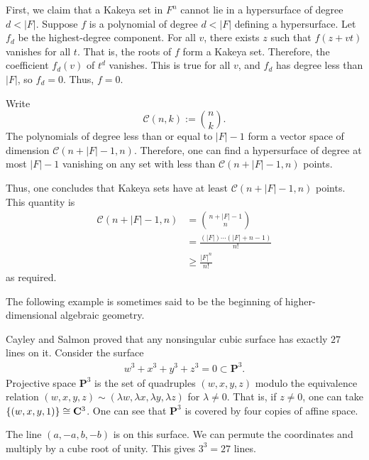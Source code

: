 \documentclass [11 pt, oneside] {article}
\begin{document}
First, we claim that a Kakeya set in $F^n$ cannot lie in a hypersurface of degree $d<\left\lvert F \right\rvert $. Suppose $f$ is a polynomial of degree $d<\left\lvert F \right\rvert $ defining a hypersurface. Let $f_d$ be the highest-degree component. For all $v$, there exists $z$ such that $f(z+vt)$ vanishes for all $t$. That is, the roots of $f$ form a Kakeya set. Therefore, the coefficient $f_d(v)$ of $t^d$ vanishes. This is true for all $v$, and $f_d$ has degree less than $\left\lvert F \right\rvert $, so $f_d=0$. Thus, $f=0$.

Write 
\[
	\mathscr{C}(n,k) := \binom{n}{k}.
\]
The polynomials of degree less than or equal to $\left\lvert F \right\rvert -1$ form a vector space of dimension $\mathscr{C} ({n+\left\lvert F \right\rvert -1},{n})$. Therefore, one can find a hypersurface of degree at most $\left\lvert F \right\rvert -1$ vanishing on any set with less than $\mathscr{C}({n+\left\lvert F \right\rvert -1},{n})$ points.

Thus, one concludes that Kakeya sets have at least $\mathscr{C}({n+\left\lvert F \right\rvert -1},{n})$ points. This quantity is 
\begin{align*}
	\mathscr{C}({n+\left\lvert F \right\rvert -1},{n}) &=\binom{n+\left\lvert F \right\rvert -1}{n}\\
	&= \frac{(\left\lvert F \right\rvert ) \cdots (\left\lvert F \right\rvert +n-1)}{n!} \\
	&\ge \frac{\left\lvert F \right\rvert ^n}{n!}
\end{align*}
as required.

The following example is sometimes said to be the beginning of higher-dimensional algebraic geometry.

\begin{example}\label{}
Cayley and Salmon proved that any nonsingular cubic surface has exactly $27$ lines on it. Consider the surface
\begin{align*}
	w^3 + x^3 +y^3 + z^3 = 0 \subset \mathbf{P}^3.
\end{align*}
Projective space $\mathbf{P}^3$ is the set of quadruples $(w,x,y,z)$ modulo the equivalence relation $(w,x,y,z)\sim  (\lambda w, \lambda x, \lambda y,\lambda z)$ for $\lambda\ne 0$. That is, if $z\ne 0$, one can take $\{(w,x,y,1)\} \cong  \mathbf{C}^3$. One can see that $\mathbf{P}^3$ is covered by four copies of affine space. 

The line $(a,-a,b,-b)$ is on this surface. We can permute the coordinates and multiply by a cube root of unity. This gives $3^3 = 27$ lines.  
\end{example}
\end{document}
